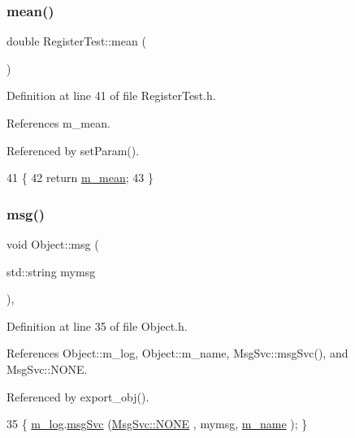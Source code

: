 \subsubsection{\texorpdfstring{mean()}{mean()}}
{\footnotesize\ttfamily double Register\+Test\+::mean (\begin{DoxyParamCaption}{ }\end{DoxyParamCaption})\hspace{0.3cm}{\ttfamily [inline]}}



Definition at line 41 of file Register\+Test.\+h.



References m\+\_\+mean.



Referenced by set\+Param().


\begin{DoxyCode}
41                \{
42     \textcolor{keywordflow}{return} \hyperlink{classRegisterTest_aba5ac8088017236617d2244fc0c261b9}{m\_mean};
43   \}
\end{DoxyCode}
\mbox{\label{classObject_a58b2d0618c2d08cf2383012611528d97}} 
\subsubsection{\texorpdfstring{msg()}{msg()}\hspace{0.1cm}{\footnotesize\ttfamily [1/2]}}
{\footnotesize\ttfamily void Object\+::msg (\begin{DoxyParamCaption}\item[{std\+::string}]{mymsg }\end{DoxyParamCaption})\hspace{0.3cm}{\ttfamily [inline]}, {\ttfamily [inherited]}}



Definition at line 35 of file Object.\+h.



References Object\+::m\+\_\+log, Object\+::m\+\_\+name, Msg\+Svc\+::msg\+Svc(), and Msg\+Svc\+::\+N\+O\+NE.



Referenced by export\+\_\+obj().


\begin{DoxyCode}
35 \{ \hyperlink{classObject_a0d269813dd7ac1f24bc143031e2963f2}{m\_log}.\hyperlink{classMsgSvc_ad25f18047920cc59a314e5098259711c}{msgSvc} (\hyperlink{classMsgSvc_ae671eb7301996cd049d2da8a65925926a9be9ae32fed8e1e6eba4a58692210fbd}{MsgSvc::NONE}    , mymsg, \hyperlink{classObject_a8b83c95c705d2c3ba0d081fe1710f48d}{m\_name} ); \}
\end{DoxyCode}
\mbox{\label{classObject_ac5d59299273cee27aacf7de00d2e7034}} 
